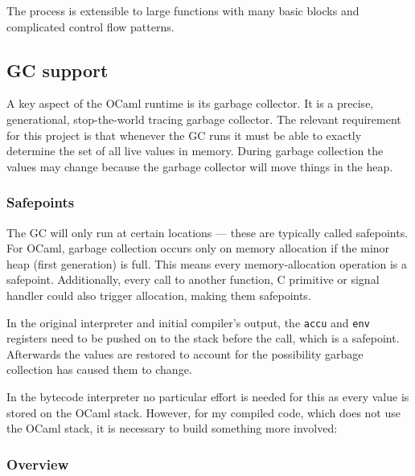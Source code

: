 The process is extensible to large functions with many basic blocks and complicated control flow
patterns.

\subsection{GC support} \label{gc-support}

A key aspect of the OCaml runtime is its garbage collector. It is a precise, generational,
stop-the-world tracing garbage collector. The relevant requirement for this project is that
whenever
the GC runs it must be able to exactly determine the set of all live values in memory. During
garbage collection the values may change because the garbage collector will move things in the
heap.

\subsubsection{Safepoints}

The GC will only run at certain locations --- these are typically called safepoints. For OCaml,
garbage collection occurs only on memory allocation if the minor heap (first generation) is full.
This means every memory-allocation operation is a safepoint. Additionally, every call to another
function, C primitive or signal handler could also trigger allocation, making them safepoints.

In the original interpreter and initial compiler's output, the \texttt{accu} and \texttt{env}
registers
need to be pushed on to the stack before the call, which is a safepoint. Afterwards the values are
restored to account for the possibility garbage collection has caused them to change.

In the bytecode interpreter no particular effort is needed for this as every value is stored on the
OCaml stack. However, for my compiled code, which does not use the OCaml stack, it is necessary to
build something more involved:

\subsubsection{Overview}

